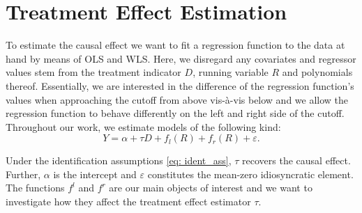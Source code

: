 
\section{Treatment Effect Estimation} %
\label{sec: estim}

To estimate the causal effect we want to fit a regression function to the data at hand by means of OLS and WLS. Here, we disregard any covariates and regressor values stem from the treatment indicator $D$, running variable $R$ and polynomials thereof. Essentially, we are interested in the difference of the regression function's values when approaching the cutoff from above vis-à-vis below and we allow the regression function to behave differently on the left and right side of the cutoff. Throughout our work, we estimate models of the following kind:
\begin{equation}
Y = \alpha + \tau D + f_{l}(R) + f_{r}(R) + \varepsilon .
\label{eq: model_general}
\end{equation}

Under the identification assumptions \ref{eq: ident_ass}, $\tau$ recovers the causal effect. Further, $\alpha$ is the intercept and $\varepsilon$ constitutes the mean-zero idiosyncratic element. The functions $f^{l}$ and $f^{r}$ are our main objects of interest and we want to investigate how they affect the treatment effect estimator $\tau$.

